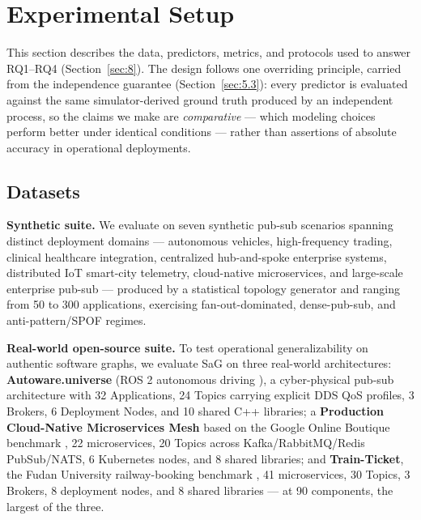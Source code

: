 \hypertarget{experimental-setup}{%
\section{Experimental Setup}\label{experimental-setup}}

\label{sec:7}

This section describes the data, predictors, metrics, and protocols used to answer RQ1--RQ4
(Section~\ref{sec:8}). The design follows one overriding principle, carried from the independence
guarantee (Section~\ref{sec:5.3}): every predictor is evaluated against the same simulator-derived
ground truth produced by an independent process, so the claims we make are \emph{comparative} ---
which modeling choices perform better under identical conditions --- rather than assertions of
absolute accuracy in operational deployments.

\hypertarget{datasets}{%
\subsection{Datasets}\label{datasets}}

\label{sec:7.1}

\textbf{Synthetic suite.} We evaluate on seven synthetic pub-sub scenarios spanning distinct
deployment domains --- autonomous vehicles, high-frequency trading, clinical healthcare integration,
centralized hub-and-spoke enterprise systems, distributed IoT smart-city telemetry, cloud-native
microservices, and large-scale enterprise pub-sub --- produced by a statistical topology generator
and ranging from 50 to 300 applications, exercising fan-out-dominated, dense-pub-sub, and
anti-pattern/SPOF regimes.

\textbf{Real-world open-source suite.} To test operational generalizability on authentic software
graphs, we evaluate SaG on three real-world architectures: \textbf{Autoware.universe} (ROS 2
autonomous driving \cite{kato2018autoware}), a cyber-physical pub-sub architecture with 32
Applications, 24 Topics carrying explicit DDS QoS profiles, 3 Brokers, 6 Deployment Nodes, and 10
shared C++ libraries; a \textbf{Production Cloud-Native Microservices Mesh} based on the Google Online
Boutique benchmark \cite{google2024onlineboutique}, 22 microservices, 20 Topics across
Kafka/RabbitMQ/Redis PubSub/NATS, 6 Kubernetes nodes, and 8 shared libraries; and
\textbf{Train-Ticket}, the Fudan University railway-booking benchmark \cite{zhou2021fault}, 41
microservices, 30 Topics, 3 Brokers, 8 deployment nodes, and 8 shared libraries --- at 90 components,
the largest of the three.

